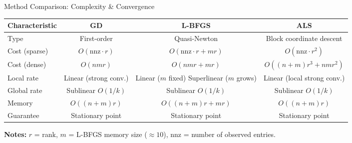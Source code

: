 \documentclass[aspectratio=169,usenames,dvipsnames]{beamer}
\begin{document}
\begin{frame}{Method Comparison: Complexity \& Convergence}

\setlength{\tabcolsep}{3.2pt}
\begin{table}[h]
\centering
\renewcommand{\arraystretch}{1.3}
\small
\begin{tabular}{|l|c|c|c|}
\hline
\textbf{Characteristic} & \textbf{GD} & \textbf{L-BFGS} & \textbf{ALS} \\
\hline
Type & First-order & Quasi-Newton & Block coordinate descent \\
\hline
Cost (sparse) & $O(\text{nnz} \cdot r)$ & $O(\text{nnz} \cdot r + m r)$ & $O(\text{nnz} \cdot r^2)$ \\
\hline
Cost (dense) & $O(n m r)$ & $O(n m r + m r)$ & $O((n+m) r^3 + n m r^2)$ \\
\hline
Local rate & Linear (strong conv.) & \parbox{3.7cm}{\centering Linear ($m$ fixed) \\ Superlinear ($m$ grows) } & Linear (local strong conv.) \\
\hline
Global rate & Sublinear $O(1/k)$ & Sublinear $O(1/k)$ & Sublinear $O(1/k)$ \\
\hline
Memory & $O((n+m)r)$ & $O((n+m)r + m r)$ & $O((n+m)r)$ \\
\hline
Guarantee & Stationary point & Stationary point & Stationary point \\
\hline
\end{tabular}
\end{table}

\vspace{0.15cm}
\textbf{Notes:} $r$ = rank, $m$ = L-BFGS memory size ($\approx 10$), nnz = number of observed entries.

\end{frame}
\end{document}
